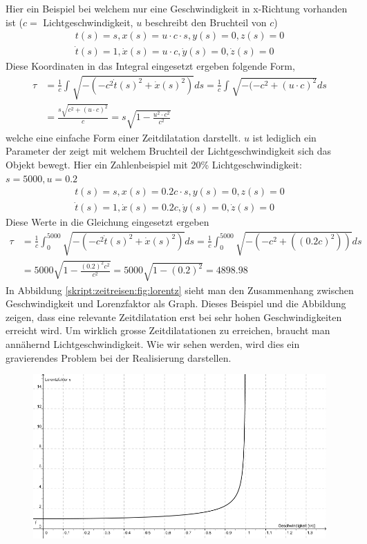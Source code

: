 \begin{refsection}
Hier ein Beispiel bei welchem nur eine Geschwindigkeit in x-Richtung vorhanden ist ($c =$ Lichtgeschwindigkeit, $u$ beschreibt den Bruchteil von $c$)
\begin{align*}
     t(s)= s, 
 	 x(s)=u\cdot c \cdot s, 
     y(s)=0, 
     z(s)=0 \\
     \dot{t}(s)=1,
     \dot{x}(s)=u\cdot c,
     \dot{y}(s)=0,
     \dot{z}(s)=0
\end{align*}
Diese Koordinaten in das Integral eingesetzt ergeben folgende Form,
\begin{align*}
    \tau
    &=
    \frac{1}{c}\int_{}^{}\sqrt{-(-c^2\dot{t}(s)^2+\dot{x}(s)^2)}ds 
    =
    \frac{1}{c}\int_{}^{}\sqrt{-(-c^2 +(u\cdot c)^{2}}ds\\
    &=
    \frac{s\sqrt{c^2+(u\cdot c)^{2}}}{c} 
    =
    s\sqrt{1-\frac{u^2\cdot c^2}{c^2}}
\end{align*}
welche eine einfache Form einer Zeitdilatation darstellt. $u$ ist lediglich ein Parameter der zeigt mit welchem Bruchteil der Lichtgeschwindigkeit sich das Objekt bewegt.
Hier ein Zahlenbeispiel mit 20\% Lichtgeschwindigkeit:
$s=5000, u=0.2$ 
\begin{align*}
    t(s)=s, 
    x(s)=0.2c \cdot s,
    y(s)=0, 
    z(s)=0 \\
    \dot{t}(s)=1,
    \dot{x}(s)=0.2c,
    \dot{y}(s)=0,
    \dot{z}(s)=0
\end{align*}
Diese Werte in die Gleichung eingesetzt ergeben
\begin{align*}
    \tau
    &=
    \frac{1}{c}\int_{0}^{5000}\sqrt{-(-c^2\dot{t}(s)^2+\dot{x}(s)^2)}ds
    =
    \frac{1}{c}\int_{0}^{5000}\sqrt{-(-c^2+((0.2c)^2))}ds\\
    &=
    5000\sqrt{1-\frac{(0.2)^2 c^2}{c^2}} 
    =
    5000\sqrt{1-(0.2)^2}
    =
    4898.98
\end{align*}
In Abbildung \ref{skript:zeitreisen:fig:lorentz}  sieht man den Zusammenhang zwischen Geschwindigkeit und Lorenzfaktor als Graph. Dieses Beispiel und die Abbildung zeigen, dass eine relevante Zeitdilatation erst bei sehr hohen Geschwindigkeiten erreicht wird. Um wirklich grosse Zeitdilatationen zu erreichen, braucht man annähernd Lichtgeschwindigkeit. Wie wir sehen werden, wird dies ein gravierendes Problem bei der Realisierung darstellen.
\begin{figure}[H]
    \centering
    \includegraphics[width=\hsize]{zeitreisen/Lorentzfaktor.jpg}

\end{figure}
\end{refsection}
